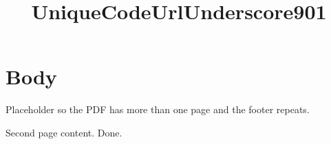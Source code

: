 \documentclass[titlepage=formal,code=listings]{SUSTechHomework}
\title{UniqueCodeUrlUnderscore901}
\begin{document}
\clearauthors
{}
\maketitle

\section{Body}
Placeholder so the PDF has more than one page and the footer repeats.
\par\vfill
Second page content.
\newpage
Done.
\end{document}
